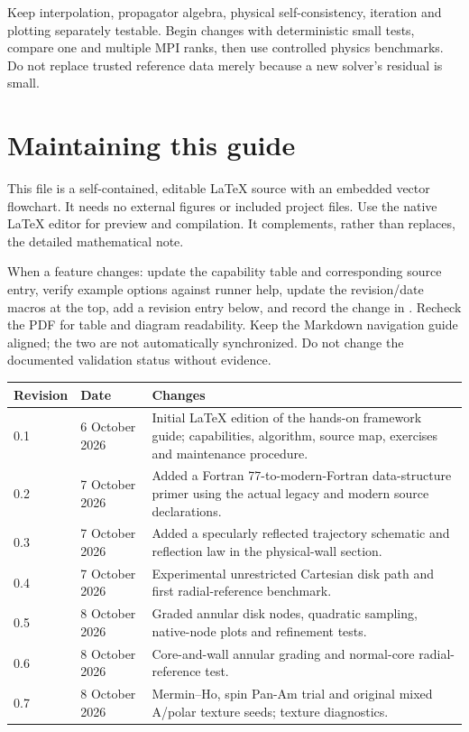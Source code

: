 \documentclass[11pt,a4paper]{article}
\let\file\path
\begin{document}
Keep interpolation, propagator algebra, physical self-consistency, iteration
and plotting separately testable. Begin changes with deterministic small tests,
compare one and multiple MPI ranks, then use controlled physics benchmarks.
Do not replace trusted reference data merely because a new solver's residual
is small.

\section{Maintaining this guide}
This file is a self-contained, editable LaTeX source with an embedded vector
flowchart. It needs no external figures or included project files. Use the
native LaTeX editor for preview and compilation. It complements, rather than
replaces, the detailed mathematical note.

When a feature changes: update the capability table and corresponding source
entry, verify example options against runner help, update the revision/date
macros at the top, add a revision entry below, and record the change in
\file{MODERNIZATION_LOG.md}. Recheck the PDF for table and diagram readability.
Keep the Markdown navigation guide aligned; the two are not automatically
synchronized. Do not change the documented validation status without evidence.

\begin{center}\small
\begin{tabular}{p{.12\linewidth}p{.20\linewidth}p{.56\linewidth}}
\toprule Revision & Date & Changes \\\midrule
0.1 & 6 October 2026 & Initial LaTeX edition of the hands-on framework guide;
capabilities, algorithm, source map, exercises and maintenance procedure. \\
0.2 & 7 October 2026 & Added a Fortran 77-to-modern-Fortran data-structure primer using the actual legacy and modern source declarations. \\
0.3 & 7 October 2026 & Added a specularly reflected trajectory schematic and reflection law in the physical-wall section. \\
0.4 & 7 October 2026 & Experimental unrestricted Cartesian disk path and first radial-reference benchmark. \\
0.5 & 8 October 2026 & Graded annular disk nodes, quadratic sampling, native-node plots and refinement tests. \\
0.6 & 8 October 2026 & Core-and-wall annular grading and normal-core radial-reference test. \\
0.7 & 8 October 2026 & Mermin--Ho, spin Pan-Am trial and original mixed A/polar texture seeds; texture diagnostics. \\\bottomrule
\end{tabular}\end{center}
\clearpage
\appendix
\end{document}
